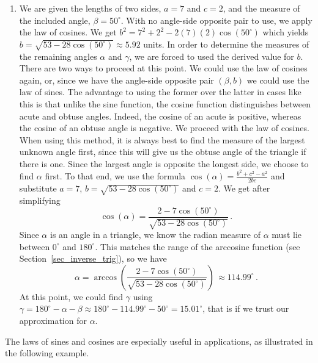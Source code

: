 \begin{example}
\begin{enumerate}
\item  We are given the lengths of two sides, $a=7$ and $c = 2$, and the measure of the included angle, $\beta = 50^{\circ}$.  With no angle-side opposite pair to use, we apply  the law of cosines.  We get  $b^2 = 7^2 + 2^2 - 2(7)(2)\cos\left(50^{\circ}\right)$ which yields $b = \sqrt{53-28\cos\left(50^{\circ}\right)} \approx 5.92$ units.  In order to determine the measures of the remaining angles $\alpha$ and $\gamma$, we are forced to used the derived value for $b$. There are two ways to proceed at this point.  We could use the law of cosines again, or, since  we have the angle-side opposite pair $(\beta, b)$ we could use the law of sines. The advantage to using the former over the latter in cases like this is that unlike the sine function, the cosine function distinguishes between acute and obtuse angles. Indeed, the cosine of an acute is positive, whereas the cosine of an obtuse angle is negative.  We proceed with the law of cosines.  When using this method, it is always best to find the measure of the largest unknown angle first, since this will give us the obtuse angle of the triangle if there is one.  Since the largest angle is opposite the longest side, we choose to find $\alpha$ first. To that end, we use the formula $\cos(\alpha) = \frac{b^2+c^2-a^2}{2bc}$ and substitute $a = 7$, $b =  \sqrt{53-28\cos\left(50^{\circ}\right)}$ and $c = 2$. We get after simplifying \[\cos(\alpha) = \frac{2-7\cos\left(50^{\circ}\right)}{\sqrt{53-28\cos\left(50^{\circ}\right)}}\,.\]  Since $\alpha$ is an angle in a triangle, we know the radian measure of $\alpha$ must lie between $0^{\circ}$ and $180^{\circ}$.  This matches the range of the arccosine function (see Section~\ref{sec_inverse_trig}), so we have \[\alpha = \arccos\left(\frac{2-7\cos\left(50^{\circ}\right)}{\sqrt{53-28\cos\left(50^{\circ} \right)}}\right) \, \approx  114.99^{\circ}\,.\] At this point, we could find $\gamma$ using $\gamma = 180^{\circ} - \alpha - \beta \approx 180^{\circ} - 114.99^{\circ} - 50^{\circ} = 15.01^{\circ}$, that is if we trust our approximation for $\alpha$.


\end{enumerate}

\end{example}


The laws of sines and cosines are especially useful in applications, as illustrated in the following example. 

